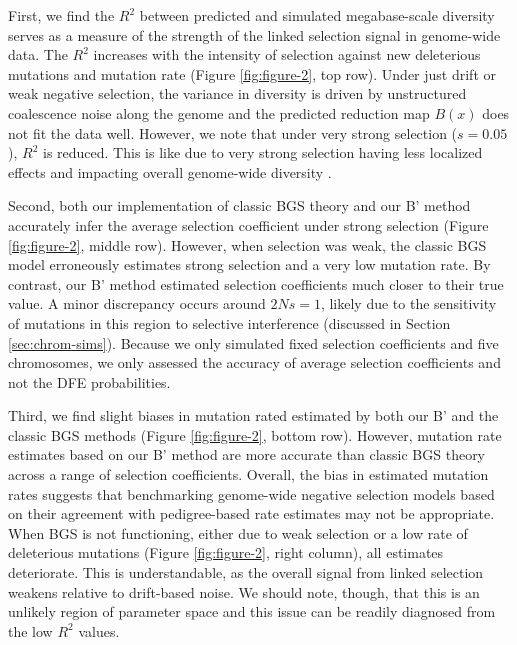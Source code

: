\documentclass[11pt]{article}
\begin{document}
First, we find the $R^2$ between predicted and simulated megabase-scale
diversity serves as a measure of the strength of the linked selection signal in
genome-wide data. The $R^2$ increases with the intensity of selection against
new deleterious mutations and mutation rate (Figure \ref{fig:figure-2}, top
row). Under just drift or weak negative selection, the variance in diversity is
driven by unstructured coalescence noise along the genome and the predicted
reduction map $B(x)$ does not fit the data well. However, we note that under
very strong selection ($s=0.05$), $R^2$ is reduced. This is like due to very
strong selection having less localized effects and impacting overall
genome-wide diversity \parencite{Santiago1995-hx,Robertson1961-ho}.

Second, both our implementation of classic BGS theory and our B' method
accurately infer the average selection coefficient under strong selection
(Figure \ref{fig:figure-2}, middle row). However, when selection was weak, the
classic BGS model erroneously estimates strong selection and a very low
mutation rate. By contrast, our B' method estimated selection coefficients much
closer to their true value. A minor discrepancy occurs around $2Ns = 1$, likely
due to the sensitivity of mutations in this region to selective interference
(discussed in Section \ref{sec:chrom-sims}). Because we only simulated fixed
selection coefficients and five chromosomes, we only assessed the accuracy of
average selection coefficients and not the DFE probabilities.

Third, we find slight biases in mutation rated estimated by both our B' and the
classic BGS methods (Figure \ref{fig:figure-2}, bottom row). However, mutation
rate estimates based on our B' method are more accurate than classic BGS theory
across a range of selection coefficients. Overall, the bias in estimated
mutation rates suggests that benchmarking genome-wide negative selection models
based on their agreement with pedigree-based rate estimates may not be
appropriate. When BGS is not functioning, either due to weak selection or a low
rate of deleterious mutations (Figure \ref{fig:figure-2}, right column), all
estimates deteriorate. This is understandable, as the overall signal from
linked selection weakens relative to drift-based noise. We should note, though,
that this is an unlikely region of parameter space and this issue can be
readily diagnosed from the low $R^2$ values.
\end{document}
